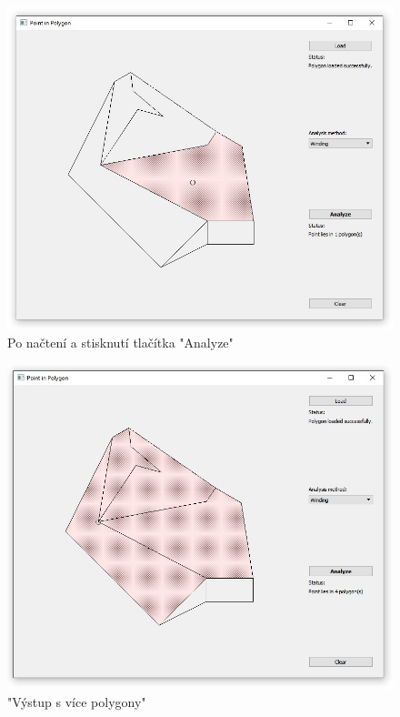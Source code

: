 \documentclass{article}
\begin{document}
\begin{figure}[htbp]
\centering
        \includegraphics[clip, trim=0cm 0cm 0cm 0cm, width=1\textwidth]{analyzed.jpg}
        \caption{Po načtení a stisknutí tlačítka "Analyze"}
 \end{figure}       
        \begin{figure}[htbp]
\centering
        \includegraphics[clip, trim=0cm 0cm 0cm 0cm, width=1\textwidth]{more.jpg}
        \caption{"Výstup s více polygony"}
\end{figure}
\clearpage
\end{document}
